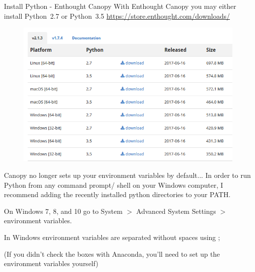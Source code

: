 \documentclass[10pt]{beamer}
\begin{document}
\begin{frame}{Install Python - Enthought Canopy}
With Enthought Canopy you may either install Python~2.7 or Python~3.5
\url{https://store.enthought.com/downloads/}
          \begin{figure} 	
 	\includegraphics[width=1.0\textwidth]{figs/canopyInstall.png}
      \end{figure}
\end{frame}

\begin{frame}{Canopy no longer sets up your environment variables by default...}
In order to run Python from any command prompt/ shell on your Windows computer, I recommend adding the recently installed python directories to your PATH.



On Windows 7, 8, and 10 go to System $>$ Advanced System Settings $>$ environment variables.

In Windows environment variables are separated without spaces using ;

(If you didn't check the boxes with Anaconda, you'll need to set up the environment variables yourself)
\end{frame}
\end{document}
